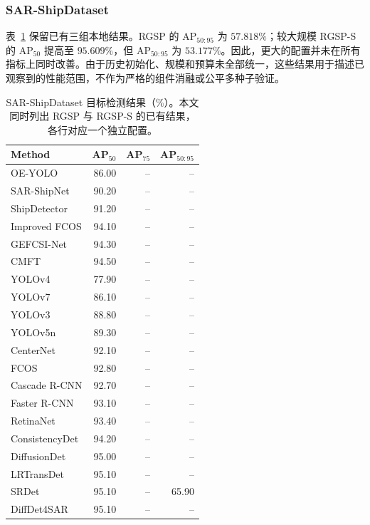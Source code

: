 \documentclass[journal]{IEEEtran}
\begin{document}
\subsubsection{SAR-ShipDataset}
\label{sec:sar_ship_results}

表~\ref{tab:sar_ship_comparison} 保留已有三组本地结果。RGSP 的 $\mathrm{AP}_{50:95}$ 为 $57.818\%$；较大规模 RGSP-S 的 $\mathrm{AP}_{50}$ 提高至 $95.609\%$，但 $\mathrm{AP}_{50:95}$ 为 $53.177\%$。因此，更大的配置并未在所有指标上同时改善。由于历史初始化、规模和预算未全部统一，这些结果用于描述已观察到的性能范围，不作为严格的组件消融或公平多种子验证。

\begin{table}[!t]
\centering
\small
\setlength{\tabcolsep}{5pt}
\caption{SAR-ShipDataset 目标检测结果（\%）。本文同时列出 RGSP 与 RGSP-S 的已有结果，各行对应一个独立配置。}
\label{tab:sar_ship_comparison}
\begin{tabular*}{\textwidth}{@{\extracolsep{\fill}}lrrr}
\toprule
Method & AP$_{50}$ & AP$_{75}$ & AP$_{50:95}$ \\
\midrule
OE-YOLO        & 86.00 & -- & -- \\
SAR-ShipNet    & 90.20 & -- & -- \\
ShipDetector   & 91.20 & -- & -- \\
Improved FCOS  & 94.10 & -- & -- \\
GEFCSI-Net     & 94.30 & -- & -- \\
CMFT           & 94.50 & -- & -- \\
YOLOv4         & 77.90 & -- & -- \\
YOLOv7         & 86.10 & -- & -- \\
YOLOv3         & 88.80 & -- & -- \\
YOLOv5n        & 89.30 & -- & -- \\
CenterNet      & 92.10 & -- & -- \\
FCOS           & 92.80 & -- & -- \\
Cascade R-CNN  & 92.70 & -- & -- \\
Faster R-CNN   & 93.10 & -- & -- \\
RetinaNet      & 93.40 & -- & -- \\
ConsistencyDet & 94.20 & -- & -- \\
DiffusionDet   & 95.00 & -- & -- \\
LRTransDet     & 95.10 & -- & -- \\
SRDet          & 95.10 & -- & 65.90 \\
DiffDet4SAR    & 95.10 & -- & -- \\

\end{tabular*}
\end{table}
\end{document}
